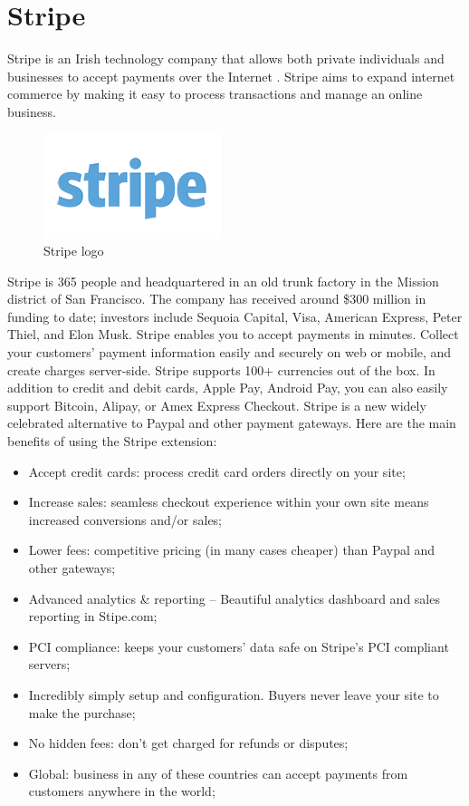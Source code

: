\section{Stripe}
\label{sec:stripe}
Stripe is an Irish technology company that allows both private individuals and businesses to accept payments over the Internet \cite{stripe_doc_a}.
Stripe aims to expand internet commerce by making it easy to process transactions and manage an online business.
\begin{figure}[htb]
\centering
\includegraphics[width=0.5\linewidth]{images/chapter2/stripe-logo.png}\hfill
\caption[Stripe logo]{Stripe logo}
\label{fig:stripe_logo}
\end{figure}
Stripe is 365 people and headquartered in an old trunk factory in the Mission district of San Francisco. The company has received around \$300 million in funding to date; investors include Sequoia Capital, Visa, American Express, Peter Thiel, and Elon Musk. Stripe enables you to accept payments in minutes. Collect your customers’ payment information easily and securely on web or mobile, and create charges server-side. Stripe supports 100+ currencies out of the box. In addition to credit and debit cards, Apple Pay, Android Pay, you can also easily support Bitcoin, Alipay, or Amex Express Checkout.
\newline
Stripe is a new widely celebrated alternative to Paypal and other payment gateways. Here are the main benefits of using the Stripe extension:
\begin{itemize}
\item Accept credit cards: process credit card orders directly on your site;
\item Increase sales: seamless checkout experience within your own site means increased conversions and/or sales;
\item Lower fees: competitive pricing (in many cases cheaper) than Paypal and other gateways;
\item Advanced analytics \& reporting – Beautiful analytics dashboard and sales reporting in Stipe.com;
\item PCI compliance: keeps your customers’ data safe on Stripe’s PCI compliant servers;
\item Incredibly simply setup and configuration. Buyers never leave your site to make the purchase;
\item No hidden fees: don’t get charged for refunds or disputes;
\item Global: business in any of these countries can accept payments from customers anywhere in the world;
\end{itemize}
